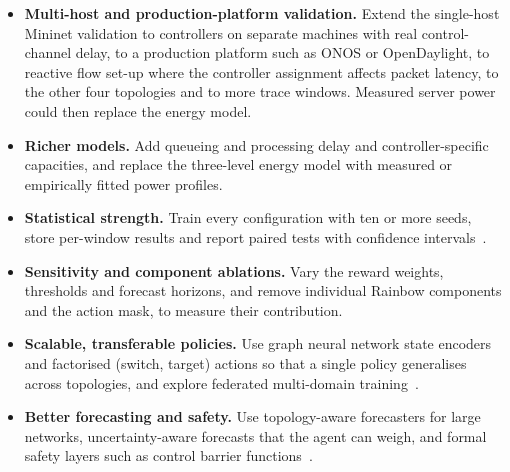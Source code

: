 \begin{itemize}[leftmargin=*]
  \item \textbf{Multi-host and production-platform validation.} Extend the single-host Mininet validation to controllers on separate machines with real control-channel delay, to a production platform such as ONOS or OpenDaylight, to reactive flow set-up where the controller assignment affects packet latency, to the other four topologies and to more trace windows. Measured server power could then replace the energy model.
  \item \textbf{Richer models.} Add queueing and processing delay and controller-specific capacities, and replace the three-level energy model with measured or empirically fitted power profiles.
  \item \textbf{Statistical strength.} Train every configuration with ten or more seeds, store per-window results and report paired tests with confidence intervals~\cite{agarwal2021precipice}.
  \item \textbf{Sensitivity and component ablations.} Vary the reward weights, thresholds and forecast horizons, and remove individual Rainbow components and the action mask, to measure their contribution.
  \item \textbf{Scalable, transferable policies.} Use graph neural network state encoders and factorised (switch, target) actions so that a single policy generalises across topologies, and explore federated multi-domain training~\cite{jha2026federated}.
  \item \textbf{Better forecasting and safety.} Use topology-aware forecasters for large networks, uncertainty-aware forecasts that the agent can weigh, and formal safety layers such as control barrier functions~\cite{dinh2025safe}.
\end{itemize}
